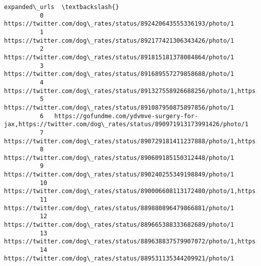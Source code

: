 \documentclass[11pt]{article}
\begin{document}
\begin{Verbatim}[commandchars=\\\{\}]
                                                                                                                                expanded\_urls  \textbackslash{}
          0   https://twitter.com/dog\_rates/status/892420643555336193/photo/1                                                                   
          1   https://twitter.com/dog\_rates/status/892177421306343426/photo/1                                                                   
          2   https://twitter.com/dog\_rates/status/891815181378084864/photo/1                                                                   
          3   https://twitter.com/dog\_rates/status/891689557279858688/photo/1                                                                   
          4   https://twitter.com/dog\_rates/status/891327558926688256/photo/1,https://twitter.com/dog\_rates/status/891327558926688256/photo/1   
          5   https://twitter.com/dog\_rates/status/891087950875897856/photo/1                                                                   
          6   https://gofundme.com/ydvmve-surgery-for-jax,https://twitter.com/dog\_rates/status/890971913173991426/photo/1                       
          7   https://twitter.com/dog\_rates/status/890729181411237888/photo/1,https://twitter.com/dog\_rates/status/890729181411237888/photo/1   
          8   https://twitter.com/dog\_rates/status/890609185150312448/photo/1                                                                   
          9   https://twitter.com/dog\_rates/status/890240255349198849/photo/1                                                                   
          10  https://twitter.com/dog\_rates/status/890006608113172480/photo/1,https://twitter.com/dog\_rates/status/890006608113172480/photo/1   
          11  https://twitter.com/dog\_rates/status/889880896479866881/photo/1                                                                   
          12  https://twitter.com/dog\_rates/status/889665388333682689/photo/1                                                                   
          13  https://twitter.com/dog\_rates/status/889638837579907072/photo/1,https://twitter.com/dog\_rates/status/889638837579907072/photo/1   
          14  https://twitter.com/dog\_rates/status/889531135344209921/photo/1                                                                   
          

\end{Verbatim}
\end{document}
